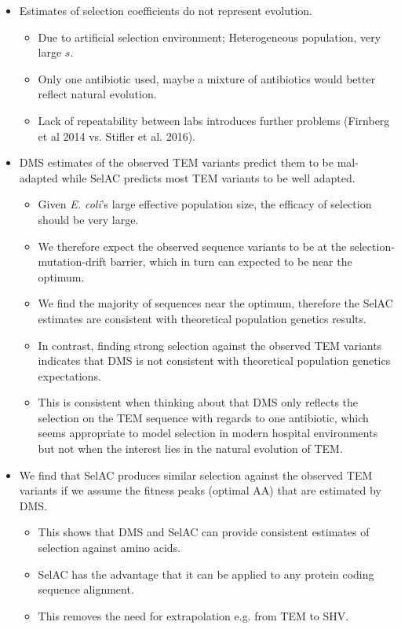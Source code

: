 \documentclass[12pt]{article}
\begin{document}
\begin{itemize}
	\item Estimates of selection coefficients do not represent evolution.
 	\begin{itemize}
		\item Due to artificial selection environment; Heterogeneous population, very large $s$. 
		\item Only one antibiotic used, maybe a mixture of antibiotics would better reflect natural evolution.
		\item Lack of repeatability between labs introduces further problems (Firnberg et al 2014 vs. Stifler et al. 2016).
	\end{itemize}

	\item DMS estimates of the observed TEM variants predict them to be mal-adapted while SelAC predicts most TEM variants to be well adapted.
	\begin{itemize}
		\item Given \textit{E. coli}'s large effective population size, the efficacy of selection should be very large.
		\item We therefore expect the observed sequence variants to be at the selection-mutation-drift barrier, which in turn can expected to be near the optimum.
		\item We find the majority of sequences near the optimum, therefore the SelAC estimates are consistent with theoretical population genetics results.
		\item In contrast, finding strong selection against the observed TEM variants indicates that DMS is not consistent with theoretical population genetics expectations.
		\item This is consistent when thinking about that DMS only reflects the selection on the TEM sequence with regards to one antibiotic, which seems appropriate to model selection in modern hospital environments but not when the interest lies in the natural evolution of TEM.
	\end{itemize}

	\item We find that SelAC produces similar selection against the observed TEM variants  if we assume the fitness peaks (optimal AA) that are estimated by DMS.
	\begin{itemize}
		\item This shows that DMS and SelAC can provide consistent estimates of selection against amino acids.
		\item SelAC has the advantage that it can be applied to any protein coding sequence alignment.
		\item This removes the need for extrapolation e.g. from TEM to SHV.
	\end{itemize}


\end{itemize}
\end{document}
